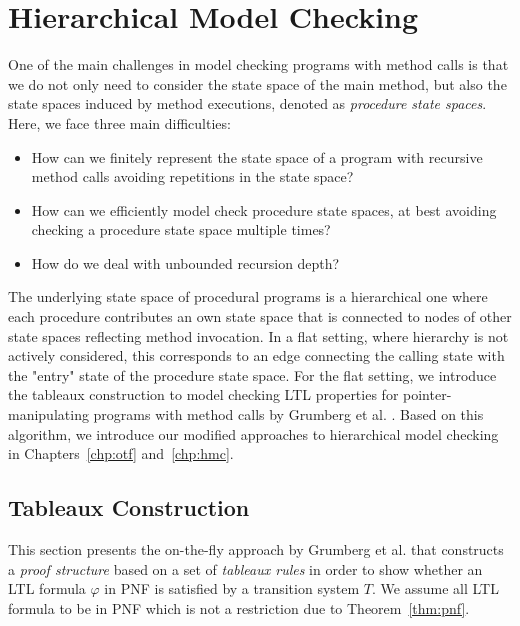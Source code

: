 \documentclass[a4paper, 12pt, twoside]{report}
\begin{document}
	\chapter{Hierarchical Model Checking}\label{chp:tableaux}
	
	One of the main challenges in model checking programs with method calls is that we do not only need to consider the state space of the main method, but also the state spaces induced by method executions, denoted as \textit{procedure state spaces}. Here, we face three main difficulties:
	\begin{itemize}
		\item How can we finitely represent the state space of a program with recursive method calls avoiding repetitions in the state space?
		\item How can we efficiently model check procedure state spaces, at best avoiding checking a procedure state space multiple times? 
		\item How do we deal with unbounded recursion depth?
	\end{itemize}
	
	The underlying state space of procedural programs is a hierarchical one where each procedure contributes an own state space that is connected to nodes of other state spaces reflecting method invocation. In a flat setting, where hierarchy is not actively considered, this corresponds to an edge connecting the calling state with the "entry" state of the procedure state space. For the flat setting, we introduce the tableaux construction to model checking LTL properties for pointer-manipulating programs with method calls by Grumberg et al. \cite{bhat1995efficient}. Based on this algorithm, we introduce our modified approaches to hierarchical model checking in Chapters~\ref{chp:otf} and~\ref{chp:hmc}.
	
	\section{Tableaux Construction}\label{sec:tableaux}
	
	This section presents the on-the-fly approach by Grumberg et al. \cite{bhat1995efficient} that constructs a \textit{proof structure} based on a set of \textit{tableaux rules} in order to show whether an LTL formula $\varphi$ in PNF is satisfied by a transition system $T$. We assume all LTL formula to be in PNF which is not a restriction due to Theorem~\ref{thm:pnf}. \\
	
\end{document}
